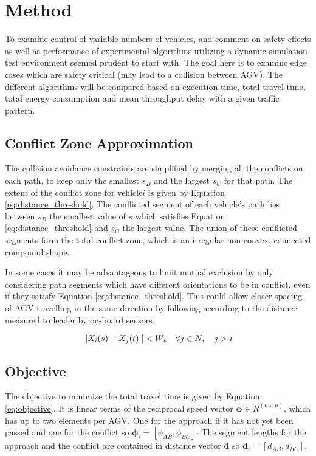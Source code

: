 \section{Method}
To examine control of variable numbers of vehicles, and comment on safety effects as well as performance of experimental algorithms utilizing a dynamic simulation test environment seemed prudent to start with. The goal here is to examine edge cases which are safety critical (may lead to a collision between AGV). The different algorithms will be compared based on execution time, total travel time, total energy consumption and mean throughput delay with a given traffic pattern.

\subsection{Conflict Zone Approximation}
\label{sec:conflict_zone}
The collision avoidance constraints are simplified by merging all the conflicts on each path, to keep only the smallest $s_B$ and the largest $s_C$ for that path. The extent of the conflict zone for vehicle$i$ is given by Equation \ref{eq:distance_threshold}. The conflicted segment of each vehicle's path lies between $s_B$ the smallest value of $s$ which satisfies Equation \ref{eq:distance_threshold} and $s_C$ the largest value. The union of these conflicted segments form the total conflict zone, which is an irregular non-convex, connected compound shape. 

In some cases it may be advantageous to limit mutual exclusion by only considering path segments which have different orientations to be in conflict, even if they satisfy Equation \ref{eq:distance_threshold}. This could allow closer spacing of AGV travelling in the same direction by following according to the distance measured to leader by on-board sensors.

\begin{equation}
	\label{eq:distance_threshold}
	||X_i(s) - X_j(t)|| < W_v \quad \forall j \in N, \quad j>i\\
\end{equation}

\subsection{Objective}
The objective to minimize the total travel time is given by Equation \ref{eq:objective}. It is linear terms of the reciprocal speed vector $\bm{\phi} \in R^{(n \times n)}$, which has up to two elements per AGV. One for the approach if it has not yet been passed and one for the conflict so $\bm{\phi}_i = [\phi_{AB}, \phi_{BC}]$. The segment lengths for the approach and the conflict are contained in distance vector $\bm{d}$ so $\bm{d}_i =[d_{AB}, d_{BC}] $.

